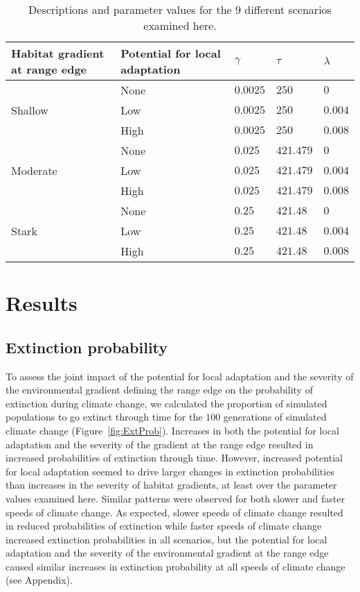 \documentclass[11pt, oneside]{article}
\begin{document}
\begin{table}
\renewcommand{\arraystretch}{1.5}
  \begin{tabular}{ p{4cm} | p{4cm} | p{1.5cm} | p{1.5cm} | p{1.5cm} }
    \hline
    Habitat gradient at range edge & Potential for local adaptation & $\gamma$ & $\tau$ & $\lambda$  \\ \hline \hline
     & None & $0.0025$ & $250$ & $0$ \\
    Shallow & Low & $0.0025$ & $250$ & $0.004$ \\
     & High & $0.0025$ & $250$ & $0.008$ \\ \hline
     & None & $0.025$ & $421.479$ & $0$ \\
    Moderate & Low & $0.025$ & $421.479$ & $0.004$ \\
     & High & $0.025$ & $421.479$ & $0.008$ \\ \hline
     & None & $0.25$ & $421.48$ & $0$ \\
    Stark & Low & $0.25$ & $421.48$ & $0.004$ \\
     & High & $0.25$ & $421.48$ & $0.008$ \\ 
    \hline
  \end{tabular}
\caption[LoF entry]{Descriptions and parameter values for the $9$ different scenarios examined here.}
\label{table:Scenarios}
\end{table}

\section{Results}
\subsection{Extinction probability}
To assess the joint impact of the potential for local adaptation and the severity of the environmental gradient defining the range edge on the probability of extinction during climate change, we calculated the proportion of simulated populations to go extinct through time for the $100$ generations of simulated climate change (Figure~\ref{fig:ExtProb}). Increases in both the potential for local adaptation and the severity of the gradient at the range edge resulted in increased probabilities of extinction through time. However, increased potential for local adaptation seemed to drive larger changes in extinction probabilities than increases in the severity of habitat gradients, at least over the parameter values examined here. Similar patterns were observed for both slower and faster speeds of climate change. As expected, slower speeds of climate change resulted in reduced probabilities of extinction while faster speeds of climate change increased extinction probabilities in all scenarios, but the potential for local adaptation and the severity of the environmental gradient at the range edge caused similar increases in extinction probability at all speeds of climate change (see Appendix).
\end{document}
